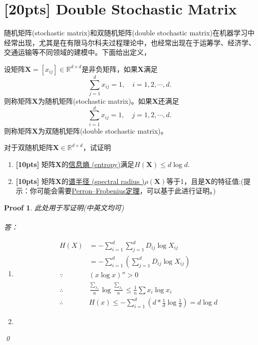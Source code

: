\documentclass[a4paper,UTF8]{article}
\numberwithin{equation}{section}
\newtheorem*{myProof}{Proof}
\begin{document}
\section{[20pts] Double Stochastic Matrix}
随机矩阵(stochastic matrix)和双随机矩阵(double stochastic matrix)在机器学习中经常出现，尤其是在有限马尔科夫过程理论中，也经常出现在于运筹学、经济学、交通运输等不同领域的建模中。下面给出定义，
\begin{def-box}[随机矩阵]
设矩阵$\mathbf{X}=[x_{ij}]\in \mathbb{R}^{d\times d}$是非负矩阵，如果$\mathbf{X}$满足
\begin{equation}
	\label{eq-sto-matrix}
	\sum_{j=1}^d x_{ij} = 1,\quad i=1,2,\cdots,d.
\end{equation}
则称矩阵$\mathbf{X}$为随机矩阵(stochastic matrix)。如果$\mathbf{X}$还满足
\begin{equation}
	\label{eq-double-sto-matrix}
	\sum_{i=1}^d x_{ij} = 1,\quad j=1,2,\cdots,d.
\end{equation}
则称矩阵$\mathbf{X}$为双随机矩阵(double stochastic matrix)。
\end{def-box}
对于双随机矩阵$\mathbf{X} \in \mathbb{R}^{d\times d}$，试证明
\begin{enumerate}[ {(}1{)}]
\item \textbf{[10pts]} 矩阵$\mathbf{X}$的\href{https://en.wikipedia.org/wiki/Entropy_(information_theory)}{信息熵 (entropy)}满足$H(\mathbf{X}) \leq d\log d$.
\item \textbf{[10pts]} 矩阵$\mathbf{X}$的\href{https://en.wikipedia.org/wiki/Spectral_radius}{谱半径 (spectral radius
)}$\rho(\mathbf{X})$等于1，且是$\mathbf{X}$的特征值;(提示：你可能会需要\href{https://en.wikipedia.org/wiki/Perron%E2%80%93Frobenius_theorem}{Perron–Frobenius定理}，可以基于此进行证明。)
\end{enumerate}
\begin{myProof}
此处用于写证明(中英文均可)
~\\
~\\
答：\\
\begin{enumerate}[ {(}1{)}]
\item
\begin{eqnarray*}
	&H(X)&= -\sum_{i=1}^{d}\sum_{j=1}^{d}{D_{ij}\log{X_{ij}}}\\
		 &&= -\sum_{i=1}^{d}(\sum_{j=1}^{d}{D_{ij}\log{X_{ij}}})\\
	&\because &(x\log{x})'' > 0\\
	&\therefore &{\frac{\sum_{x_i}}{n}}\log{{\frac{\sum_{x_i}}{n}}} 
				\leq \frac{1}{n}\sum{x_i\log{x_i}}\\
	&\therefore &H(x) \leq -\sum_{i=1}^{d}
	{(d*\frac{1}{d}\log{\frac{1}{d}})}=d\log{d}
\end{eqnarray*}
\item

\end{enumerate}

\qed
\end{myProof}
\newpage
\end{document}
